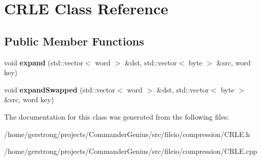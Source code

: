 \hypertarget{class_c_r_l_e}{
\section{CRLE Class Reference}
\label{class_c_r_l_e}
}
\subsection*{Public Member Functions}
\begin{DoxyCompactItemize}
\item 
\hypertarget{class_c_r_l_e_aca3fddba3458fa67d9392cabccbdff02}{
void {\bfseries expand} (std::vector$<$ word $>$ \&dst, std::vector$<$ byte $>$ \&src, word key)}
\label{class_c_r_l_e_aca3fddba3458fa67d9392cabccbdff02}

\item 
\hypertarget{class_c_r_l_e_a7a472be26dbf241cb4d57c0462029ea8}{
void {\bfseries expandSwapped} (std::vector$<$ word $>$ \&dst, std::vector$<$ byte $>$ \&src, word key)}
\label{class_c_r_l_e_a7a472be26dbf241cb4d57c0462029ea8}

\end{DoxyCompactItemize}


The documentation for this class was generated from the following files:\begin{DoxyCompactItemize}
\item 
/home/gerstrong/projects/CommanderGenius/src/fileio/compression/CRLE.h\item 
/home/gerstrong/projects/CommanderGenius/src/fileio/compression/CRLE.cpp\end{DoxyCompactItemize}

